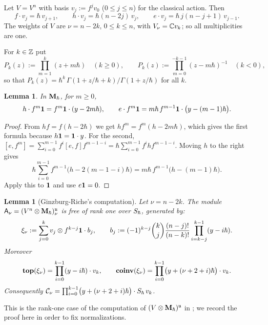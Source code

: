 \documentclass{article}
\theoremstyle{plain}
\newtheorem{lemma}[theorem]{Lemma}
\theoremstyle{definition}
\theoremstyle{remark}
\numberwithin{equation}{section}
\begin{document}
Let $V=V^n$ with basis $v_j:=f^jv_0$ ($0\le j\le n$) for the classical action. Then
\begin{equation}\label{eq:sl2-V}
f\cdot v_j=\hbar\,v_{j+1},\qquad h\cdot v_j=\hbar(n-2j)\,v_j,\qquad e\cdot v_j=\hbar\,j(n-j+1)\,v_{j-1}.
\end{equation}
The weights of $V$ are $\nu=n-2k$, $0\le k\le n$, with $V_\nu=\mathbb{C} v_k$; so all multiplicities are one.

For $k\in\mathbb{Z}$ put
\[
P_k(z):=\prod_{m=1}^{k}(z+m\hbar)\quad(k\ge0),\qquad P_k(z):=\prod_{m=0}^{-k-1}(z-m\hbar)^{-1}\quad(k<0),
\]
so that $P_k(z)=\hbar^k\,\Gamma(1+z/\hbar+k)/\Gamma(1+z/\hbar)$ for all $k$.

\begin{lemma}\label{lem:sl2-verma}
In $\mathbf{M}_\hbar$, for $m\ge0$,
\[
h\cdot f^m\mathbf 1=f^m\mathbf 1\cdot(y-2m\hbar),\qquad e\cdot f^m\mathbf 1=m\hbar\,f^{m-1}\mathbf 1\cdot\bigl(y-(m-1)\hbar\bigr).
\]
\end{lemma}

\begin{proof}
From $hf=f(h-2\hbar)$ we get $hf^m=f^m(h-2m\hbar)$, which gives the first formula because $h\mathbf 1=\mathbf 1\cdot y$. For the second, $[e,f^m]=\sum_{i=0}^{m-1}f^i[e,f]f^{m-1-i}=\hbar\sum_{i=0}^{m-1}f^ihf^{m-1-i}$. Moving $h$ to the right gives
\[
\hbar\sum_{i=0}^{m-1}f^{m-1}\bigl(h-2(m-1-i)\hbar\bigr)=m\hbar\,f^{m-1}\bigl(h-(m-1)\hbar\bigr).
\]
Apply this to $\mathbf 1$ and use $e\mathbf 1=0$.
\end{proof}

\begin{lemma}[Ginzburg-Riche's computation]\label{lem:sl2-A}
Let $\nu=n-2k$. The module $\mathsf A_\nu=(V^n\otimes\mathbf{M}_\hbar)^{\mathfrak{u}}_\nu$ is free of rank one over $S_\hbar$, generated by:
\[
\xi_\nu:=\sum_{j=0}^kv_j\otimes f^{k-j}\mathbf 1\cdot b_j,\qquad
b_j:=(-1)^{k-j}\binom kj\frac{(n-j)!}{(n-k)!}\prod_{i=k-j}^{k-1}(y-i\hbar).
\]
Moreover
\[
\operatorname{\mathbf{top}}(\xi_\nu)=\prod_{i=0}^{k-1}(y-i\hbar)\cdot v_k,\qquad
\operatorname{\mathbf{coinv}}(\xi_\nu)=\prod_{i=0}^{k-1}\bigl(y+(\nu+2+i)\hbar\bigr)\cdot v_k .
\]
Consequently $\mathcal C_\nu=\prod_{i=0}^{k-1}\bigl(y+(\nu+2+i)\hbar\bigr)\cdot S_\hbar\,v_k$.
\end{lemma}
This is the rank-one case of the computation of $(V\otimes\mathbf{M}_\hbar)^{\mathfrak{u}}$ in \cite{ginzburg2014differentialoperatorsguaffine}; we record the proof here in order to fix normalizations.
\end{document}
